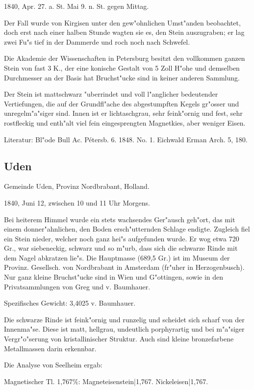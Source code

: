 \documentclass[a4paper, 11pt, oneside]{article}
\begin{document}
1840, Apr. 27. a. St. Mai 9. n. St. gegen Mittag.

Der Fall wurde von Kirgisen unter den gew"ohnlichen Umst"anden beobachtet, doch erst nach einer halben Stunde wagten sie es, den Stein auszugraben; er lag zwei Fu"s tief in der Dammerde und roch noch nach Schwefel.

Die Akademie der Wissenschaften in Petersburg besitzt den vollkommen ganzen Stein von fast 3 K., der eine konische Gestalt von 5 Zoll H"ohe und demselben Durchmesser an der Basis hat Bruchst"ucke sind in keiner anderen Sammlung.

Der Stein ist mattschwarz "uberrindet und voll l"anglicher bedeutender Vertiefungen, die auf der Grundfl"ache des abgestumpften Kegels gr"osser und unregelm"a"siger sind. Innen ist er lichtaschgrau, sehr feink"ornig und fest, sehr rostfleckig und enth"alt viel fein eingesprengten Magnetkies, aber weniger Eisen.

Literatur: Bl"ode Bull Ac. Pétersb. 6. 1848. No. 1. Eichwald Erman Arch. 5, 180.

\subsection{Uden}

Gemeinde Uden, Provinz Nordbrabant, Holland.

1840, Juni 12, zwischen 10 und 11 Uhr Morgens.

Bei heiterem Himmel wurde ein stets wachsendes Ger"ausch geh"ort, das mit einem donner"ahnlichen, den Boden ersch"utternden Schlage endigte. Zugleich fiel ein Stein nieder, welcher noch ganz hei"s aufgefunden wurde. Er wog etwa 720 Gr., war siebeneckig, schwarz und so m"urb, dass sich die schwarze Rinde mit dem Nagel abkratzen lie"s. Die Hauptmasse (689,5 Gr.) ist im Museum der Provinz. Gesellsch. von Nordbrabant in Amsterdam (fr"uher in Herzogenbusch). Nur ganz kleine Bruchst"ucke sind in Wien und G"ottingen, sowie in den Privatsammlungen von Greg und v. Baumhauer.

Spezifisches Gewicht: 3,4025 v. Baumhauer.

Die schwarze Rinde ist feink"ornig und runzelig und scheidet sich scharf von der Innenma"se. Diese ist matt, hellgrau, undeutlich porphyrartig und bei m"a"siger Vergr"o"serung von kristallinischer Struktur. Auch sind kleine bronzefarbene Metallmassen darin erkennbar.

Die Analyse von Seelheim ergab:

Magnetischer Tl. 1,767\%:  
Magneteisenstein|1,767.  
Nickeleisen|1,767.
\end{document}
